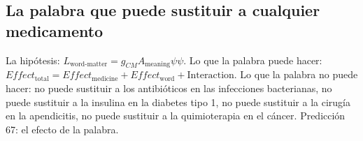 \subsection{La palabra que puede sustituir a cualquier medicamento}
La hipótesis: $L_{\text{word-matter}} = g_{CM} A_{\text{meaning}} \psi \psi$. Lo que la palabra puede hacer: $Effect_{\text{total}} = Effect_{\text{medicine}} + Effect_{\text{word}} + \text{Interaction}$. Lo que la palabra no puede hacer: no puede sustituir a los antibióticos en las infecciones bacterianas, no puede sustituir a la insulina en la diabetes tipo 1, no puede sustituir a la cirugía en la apendicitis, no puede sustituir a la quimioterapia en el cáncer. Predicción 67: el efecto de la palabra.

\newpage
